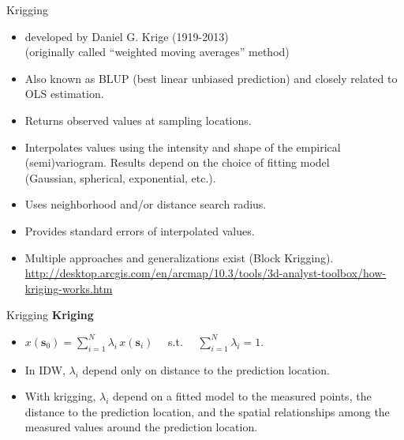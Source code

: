 \documentclass{beamer}
\begin{document}
\begin{frame}{Krigging}
\begin{itemize}
    \item developed by Daniel G. Krige (1919-2013) \\(originally called ``weighted moving averages'' method) 
    \smallskip
    \item Also known as BLUP (best linear unbiased prediction) and closely related to OLS estimation.
    \smallskip
    \item Returns observed values at sampling locations.
    \smallskip
    \item Interpolates values using the intensity and shape of the empirical (semi)variogram. Results depend on the choice of fitting model \\(Gaussian, spherical, exponential, etc.).
    \smallskip
    \item Uses neighborhood and/or distance search radius.
    \smallskip
    \item Provides standard errors of interpolated values.
    \smallskip
    \item Multiple approaches and generalizations exist (Block Krigging). \\
    \url{http://desktop.arcgis.com/en/arcmap/10.3/tools/3d-analyst-toolbox/how-kriging-works.htm}
\end{itemize}
\end{frame}
\begin{frame}{Krigging}
\textbf{Kriging}\\ \medskip
\begin{itemize}
    \item $x(\bm{s}_0)= \sum_{i=1}^N \lambda_i \, x(\bm{s}_i)$ ~~s.t.~~ $\sum_{i=1}^N \lambda_i = 1$. 
    \bigskip
    \item In IDW, $\lambda_i$ depend only on distance to the prediction location.\\
    \bigskip
    \item  With krigging, $\lambda_i$ depend on a fitted model to the measured points, the distance to the prediction location, and the spatial relationships among the measured values around the prediction location.
\end{itemize}
\end{frame}
\end{document}
